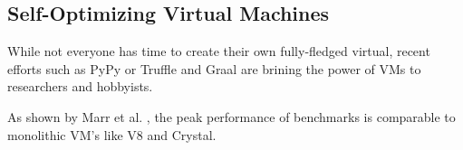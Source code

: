 \subsection{Self-Optimizing Virtual Machines}

While not everyone has time to create their own fully-fledged virtual, recent efforts such as PyPy  or Truffle and Graal \cite{Wurthinger2013} are brining the power of VMs to researchers and hobbyists.

As shown by Marr et al. \cite{Marr2016}, the peak performance of benchmarks is comparable to monolithic VM's like V8 and Crystal. 